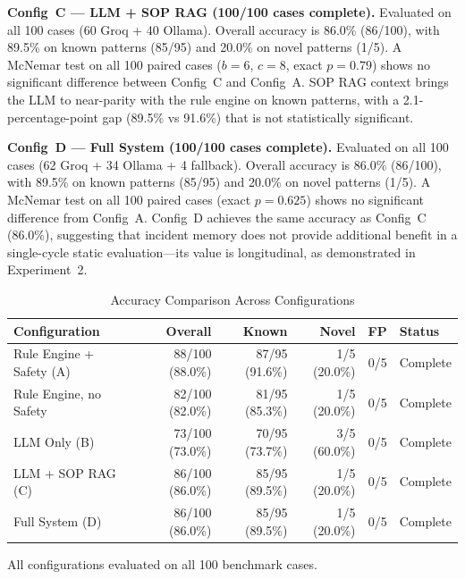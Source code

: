 \documentclass[a4paper,10pt,journal,compsoc]{IEEEtran}
\begin{document}
\textbf{Config~C --- LLM + SOP RAG (100/100 cases complete).}
Evaluated on all 100 cases (60 Groq + 40 Ollama). Overall accuracy
is 86.0\% (86/100), with 89.5\% on known patterns (85/95) and 20.0\%
on novel patterns (1/5). A McNemar test on all 100 paired cases
($b=6$, $c=8$, exact $p=0.79$) shows no significant difference
between Config~C and Config~A. SOP RAG context brings the LLM to
near-parity with the rule engine on known patterns, with a
2.1-percentage-point gap (89.5\% vs 91.6\%) that is not statistically
significant.

\textbf{Config~D --- Full System (100/100 cases complete).}
Evaluated on all 100 cases (62 Groq + 34 Ollama + 4 fallback).
Overall accuracy is 86.0\% (86/100), with 89.5\% on known patterns
(85/95) and 20.0\% on novel patterns (1/5). A McNemar test on all
100 paired cases (exact $p=0.625$) shows no significant difference
from Config~A. Config~D achieves the same accuracy as Config~C
(86.0\%), suggesting that incident memory does not provide additional
benefit in a single-cycle static evaluation---its value is
longitudinal, as demonstrated in Experiment~2.

\begin{table}[t]
  \caption{Accuracy Comparison Across Configurations}
  \label{tab:ablation}
  \centering
  \begin{tabular}{lrrrrl}
    \toprule
    \textbf{Configuration} & \textbf{Overall} & \textbf{Known} &
    \textbf{Novel} & \textbf{FP} & \textbf{Status} \\
    \midrule
    Rule Engine + Safety (A)  & 88/100 (88.0\%) & 87/95 (91.6\%) & 1/5 (20.0\%) & 0/5 & Complete \\
    Rule Engine, no Safety    & 82/100 (82.0\%) & 81/95 (85.3\%) & 1/5 (20.0\%) & 0/5 & Complete \\
    LLM Only (B)              & 73/100 (73.0\%) & 70/95 (73.7\%) & 3/5 (60.0\%) & 0/5 & Complete \\
    LLM + SOP RAG (C)         & 86/100 (86.0\%) & 85/95 (89.5\%) & 1/5 (20.0\%) & 0/5 & Complete \\
    Full System (D)           & 86/100 (86.0\%) & 85/95 (89.5\%) & 1/5 (20.0\%) & 0/5 & Complete \\
    \bottomrule
  \end{tabular}
  \smallskip

  {\footnotesize All configurations evaluated on all 100 benchmark cases.}
\end{table}
\end{document}
